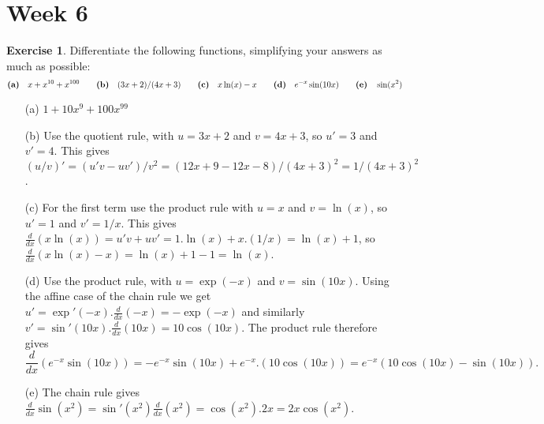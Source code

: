 \documentclass[a4paper]{amsart}
\theoremstyle{definition}
\newtheorem{exercise}{Exercise}[section]
\newenvironment{solution}{{\noindent \bf Solution:}}{}
\begin{document}
\section*{Week 6}
\addtocounter{section}{1}\setcounter{exercise}{0}

\begin{exercise}\label{ex-diff-misc-i}
Differentiate the following functions, simplifying your
 answers as much as possible:
 \[
  \text{\textbf{(a)}}\quad x+x^{10}+x^{100} \hspace{2em}
  \text{\textbf{(b)}}\quad (3x+2)/(4x+3) \hspace{2em} 
  \text{\textbf{(c)}}\quad x\ln(x)-x \hspace{2em}
  \text{\textbf{(d)}}\quad e^{-x}\sin(10 x) \hspace{2em}
  \text{\textbf{(e)}}\quad \sin(x^2)
 \]
\end{exercise}
\begin{solution}
\begin{itemize}
  \item[(a)] $1+10x^9+100x^{99}$
  \item[(b)] Use the quotient rule, with $u=3x+2$ and $v=4x+3$, so
   $u'=3$ and $v'=4$.  This gives
   $(u/v)'=(u'v-uv')/v^2=(12x+9-12x-8)/(4x+3)^2=1/(4x+3)^2$. 
  \item[(c)] For the first term use the product rule with $u=x$ and
   $v=\ln(x)$, so $u'=1$ and $v'=1/x$.  This gives
   $\tfrac{d}{dx}(x\ln(x))=u'v+uv'=1.\ln(x)+x.(1/x)=\ln(x)+1$, so
   $\tfrac{d}{dx}(x\ln(x)-x)=\ln(x)+1-1=\ln(x)$.
  \item[(d)] Use the product rule, with $u=\exp(-x)$ and
   $v=\sin(10 x)$.  Using the affine case of the chain rule we get 
   $u'=\exp'(-x).\frac{d}{dx}(-x)=-\exp(-x)$ and similarly
   $v'=\sin'(10x).\frac{d}{dx}(10x)=10\cos(10x)$.  The product rule
   therefore gives 
   \[ \frac{d}{dx}(e^{-x}\sin(10x)) =
       -e^{-x}\sin(10x)+e^{-x}.(10\cos(10x)) =  
        e^{-x}(10\cos(10 x)-\sin(10 x)).
   \]
  \item[(e)] The chain rule gives
   $\frac{d}{dx}\sin(x^2)=\sin'(x^2)\frac{d}{dx}(x^2)=\cos(x^2).2x=2x\cos(x^2)$. 
 \end{itemize}
\end{solution}
\end{document}
